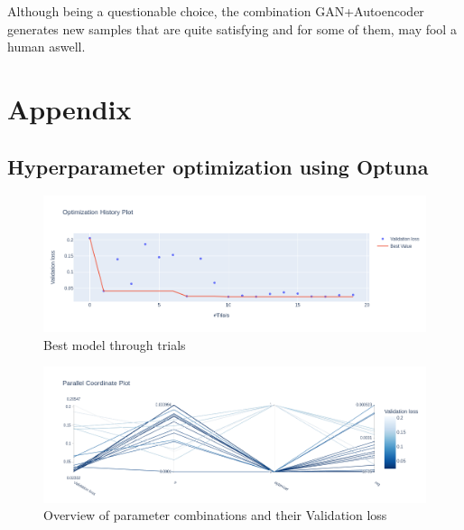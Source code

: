 \documentclass[11pt,a4paper,twocolumn]{IEEEtran}
\begin{document}
	Although being a questionable choice, the combination GAN+Autoencoder generates new samples that are quite satisfying and for some of them, may fool a human aswell.
	\newpage
	\onecolumn
	\section{\textbf{Appendix}}
	
		\subsection{Hyperparameter optimization using Optuna}
		\begin{figure}[h]
			\centering
			\includegraphics[width=1\linewidth]{../imgs/newplot(2)}
			\caption{Best model through trials}
			\label{fig:newplot2}
		\end{figure}
	\begin{figure}[h]
		\centering
		\includegraphics[width=1\linewidth]{../imgs/newplot(3)}
		\caption{Overview of parameter combinations and their Validation loss}
		\label{fig:newplot3}
	\end{figure}\newpage
\end{document}

